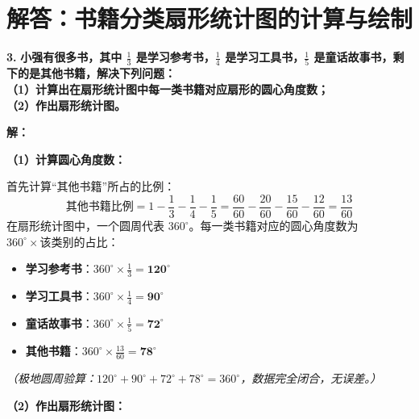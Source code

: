 \documentclass[12pt, a4paper]{ctexrep}
\begin{document}
\newpage

\section{解答：书籍分类扇形统计图的计算与绘制}

\vspace{0.6cm}

\textbf{\LARGE 3.} \textbf{小强有很多书，其中 $\frac{1}{3}$ 是学习参考书，$\frac{1}{4}$ 是学习工具书，$\frac{1}{5}$ 是童话故事书，剩下的是其他书籍，解决下列问题：\\
（1）计算出在扇形统计图中每一类书籍对应扇形的圆心角度数；\\
（2）作出扇形统计图。}

\vspace{0.4cm}
\textbf{解：}

\textbf{（1）计算圆心角度数：}

首先计算“其他书籍”所占的比例：
\[
\text{其他书籍比例} = 1 - \frac{1}{3} - \frac{1}{4} - \frac{1}{5} = \frac{60}{60} - \frac{20}{60} - \frac{15}{60} - \frac{12}{60} = \frac{13}{60}
\]
在扇形统计图中，一个圆周代表 $360^\circ$。每一类书籍对应的圆心角度数为 $360^\circ \times \text{该类别的占比}$：
\begin{itemize}
    \item \textbf{学习参考书}：$360^\circ \times \frac{1}{3} = \textbf{120}^\circ$
    \item \textbf{学习工具书}：$360^\circ \times \frac{1}{4} = \textbf{90}^\circ$
    \item \textbf{童话故事书}：$360^\circ \times \frac{1}{5} = \textbf{72}^\circ$
    \item \textbf{其他书籍}：$360^\circ \times \frac{13}{60} = \textbf{78}^\circ$
\end{itemize}
\textit{（极地圆周验算：$120^\circ + 90^\circ + 72^\circ + 78^\circ = 360^\circ$，数据完全闭合，无误差。）}

\vspace{0.4cm}
\textbf{（2）作出扇形统计图：}
\end{document}
